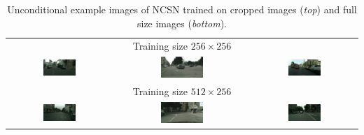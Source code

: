 \begin{table}[] \label{tab:5.3}
    \centering
    \setlength\tabcolsep{-2pt}
    \begin{tabular}{ccc}
        & Training size $256\times256$ & \\
        \includegraphics[width=0.33\textwidth]{Chapters/figures/experiments/crop/1_sample.png} &
        \includegraphics[width=0.33\textwidth]{Chapters/figures/experiments/crop/5_sample.png} &
        \includegraphics[width=0.33\textwidth]{Chapters/figures/experiments/crop/8_sample.png}\\
        & Training size $512\times256$ & \\ 
        \includegraphics[width=0.33\textwidth]{Chapters/figures/experiments/crop/0_uncond_sample.png} &
        \includegraphics[width=0.33\textwidth]{Chapters/figures/experiments/crop/3_uncond_sample.png} &
        \includegraphics[width=0.33\textwidth]{Chapters/figures/experiments/crop/7_uncond_sample.png}
    \end{tabular}
    \caption{Unconditional example images of NCSN trained on cropped images (\textit{top}) and full size images (\textit{bottom}).}
    \label{tab:my_label}
\end{table}

